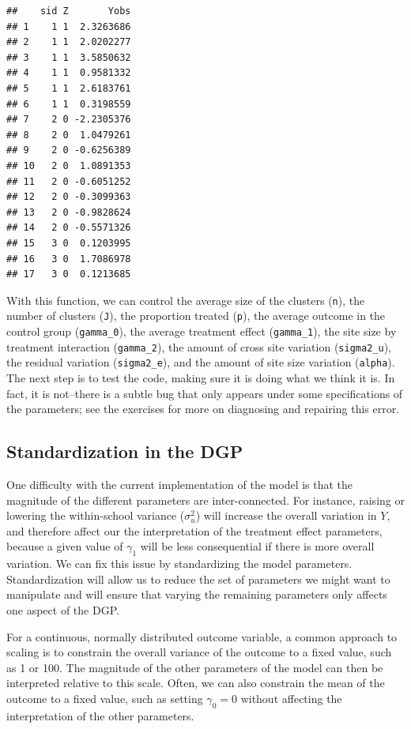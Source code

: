 \documentclass[
]{book}
\begin{document}
\begin{verbatim}
##    sid Z       Yobs
## 1    1 1  2.3263686
## 2    1 1  2.0202277
## 3    1 1  3.5850632
## 4    1 1  0.9581332
## 5    1 1  2.6183761
## 6    1 1  0.3198559
## 7    2 0 -2.2305376
## 8    2 0  1.0479261
## 9    2 0 -0.6256389
## 10   2 0  1.0891353
## 11   2 0 -0.6051252
## 12   2 0 -0.3099363
## 13   2 0 -0.9828624
## 14   2 0 -0.5571326
## 15   3 0  0.1203995
## 16   3 0  1.7086978
## 17   3 0  0.1213685
\end{verbatim}

With this function, we can control the average size of the clusters (\texttt{n}), the number of clusters (\texttt{J}), the proportion treated (\texttt{p}), the average outcome in the control group (\texttt{gamma\_0}), the average treatment effect (\texttt{gamma\_1}), the site size by treatment interaction (\texttt{gamma\_2}), the amount of cross site variation (\texttt{sigma2\_u}), the residual variation (\texttt{sigma2\_e}), and the amount of site size variation (\texttt{alpha}).
The next step is to test the code, making sure it is doing what we think it is.
In fact, it is not--there is a subtle bug that only appears under some specifications of the parameters; see the exercises for more on diagnosing and repairing this error.

\subsection{Standardization in the DGP}\label{DGP-standardization}

One difficulty with the current implementation of the model is that the magnitude of the different parameters are inter-connected.
For instance, raising or lowering the within-school variance (\(\sigma^2_u\)) will increase the overall variation in \(Y\), and therefore affect our the interpretation of the treatment effect parameters, because a given value of \(\gamma_{1}\) will be less consequential if there is more overall variation.
We can fix this issue by standardizing the model parameters.
Standardization will allow us to reduce the set of parameters we might want to manipulate and will ensure that varying the remaining parameters only affects one aspect of the DGP.

For a continuous, normally distributed outcome variable, a common approach to scaling is to constrain the overall variance of the outcome to a fixed value, such as 1 or 100.
The magnitude of the other parameters of the model can then be interpreted relative to this scale.
Often, we can also constrain the mean of the outcome to a fixed value, such as setting \(\gamma_0 = 0\) without affecting the interpretation of the other parameters.
\end{document}
